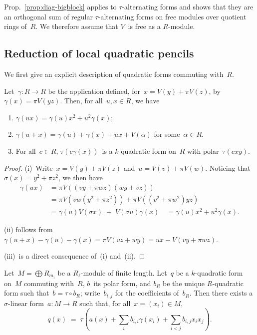 \documentclass{lms}
\def\pa#1{\left(#1\right)}
\begin{document}
Prop.~\ref{prop:diag-bigblock} applies to $τ$-alternating forms and shows
that they are an orthogonal sum of regular $τ$-alternating forms on free
modules over quotient rings of~$R$. We therefore assume that $V$~is free
as a $R$-module.

\subsection{Reduction of local quadratic pencils}

We first give an explicit description of quadratic forms commuting
with~$R$.

\begin{lem}\label{lem:gamma-polar}
Let~$γ: R → R$ be the application defined, for~$x = V(y) + π V(z)$,
by~$γ(x) = π V(yz)$. Then, for all~$u, x ∈ R$, we have
\begin{enumerate}
\item $γ(ux) = γ(u) x^2 + u^2 γ(x)$;
\item $γ(u+x) = γ(u) + γ(x) + ux + V(α)$ for some~$α ∈ R$.
\item For all~$c ∈ R$, $τ(c γ (x))$~is a $k$-quadratic form on~$R$
with polar~$τ(c x y)$.
\end{enumerate}
\end{lem}


\begin{proof}
(i)~Write~$x = V(y) + π V(z)$ and~$u = V(v) + π V(w)$. Noticing
that~$σ(x) = y^2 + π z^2$, we then have
\begin{equation}\label{eq:gamma-prod}
\begin{split}
γ(ux) &= π V\pa{(vy + π wz)(wy+vz)}\\
 &= π V\pa{vw (y^2 + π z^2)} + π V \pa{(v^2+πw^2) yz}\\
 &= γ(u) V(σx) \;+\; V(σu) γ(x) \quad = γ(u) x^2 + u^2 γ(x).
\end{split}
\end{equation}

(ii) follows from
$γ(u+x) - γ(u) - γ(x) = π V(vz + wy) = ux - V(vy+πwz)$.

(iii)~is a direct consequence of~(i) and~(ii).
\end{proof}
\begin{prop}\label{prop:quad-tau}
Let~$M = ⨁ R_{m_i}$ be a $R_ℓ$-module of finite length.
Let~$q$ be a $k$-quadratic form on~$M$ commuting with~$R$, $b$~its
polar form, and $b_R$ be the unique $R$-quadratic form such that~$b = τ ∘
b_R$; write~$b_{i,j}$ for the coefficients of~$b_R$.
Then there exists a $σ$-linear form~$a: M → R$ such that, for all~$x =
(x_i) ∈ M$,
\begin{equation}
q(x) \;=\; τ\pa{a(x) + ∑_{i} b_{i,i} γ(x_i) + ∑_{i < j} b_{i,j} x_i x_j}.
\end{equation}
\end{prop}
\end{document}
